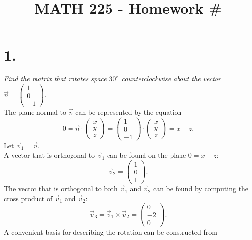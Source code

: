 \documentclass[12pt]{article}
\title{\vspace{-2\baselineskip}MATH 225 - Homework \#\HOMEWORKNUM}
\author{\NAME}
\date{\DATE}
\begin{document}
\maketitle

\section*{1.}
\textit{Find the matrix that rotates space $30 \degree$ counterclockwise about
the vector $\vec{n} = \begin{pmatrix} 1 \\ 0 \\ -1 \end{pmatrix}$.}
\\[\baselineskip]
The plane normal to $\vec{n}$ can be represented by the equation
\begin{equation*}
	0
	=
	\vec{n} \cdot \begin{pmatrix} x \\ y \\ z \end{pmatrix}
	=
	\begin{pmatrix} 1 \\ 0 \\ -1 \end{pmatrix}
	\cdot
	\begin{pmatrix} x \\ y \\ z \end{pmatrix}
	=
	x - z
	.
\end{equation*}
Let $\vec{v}_1 = \vec{n}$. \\
A vector that is orthogonal to $\vec{v}_1$ can be found on the plane
$0 = x - z$:
\begin{equation*}
	\vec{v}_2 = \begin{pmatrix} 1 \\ 0 \\ 1 \end{pmatrix}
	.
\end{equation*}
The vector that is orthogonal to both $\vec{v}_1$ and $\vec{v}_2$ can be found
by computing the cross product of $\vec{v}_1$ and $\vec{v}_2$:
\begin{equation*}
	\vec{v}_3 = \vec{v}_1 \times \vec{v}_2 =
	\begin{pmatrix} 0 \\ -2 \\ 0 \end{pmatrix}
	.
\end{equation*}
A convenient basis for describing the rotation can be constructed from
\end{document}
